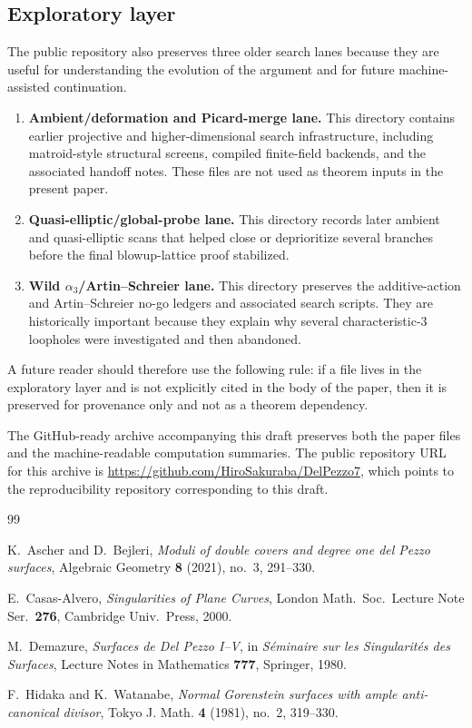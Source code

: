 \documentclass[11pt]{article}
\newcommand{\repourl}{\url{https://github.com/HiroSakuraba/DelPezzo7}}
\theoremstyle{definition}
\begin{document}
\subsection*{Exploratory layer}
The public repository also preserves three older search lanes because they are useful for understanding the evolution of the argument and for future machine-assisted continuation.
\begin{enumerate}[label=\textup{(E\arabic*)}]
\item \textbf{Ambient/deformation and Picard-merge lane.} This directory contains earlier projective and higher-dimensional search infrastructure, including matroid-style structural screens, compiled finite-field backends, and the associated handoff notes. These files are not used as theorem inputs in the present paper.
\item \textbf{Quasi-elliptic/global-probe lane.} This directory records later ambient and quasi-elliptic scans that helped close or deprioritize several branches before the final blowup-lattice proof stabilized.
\item \textbf{Wild $\alpha_3$/Artin--Schreier lane.} This directory preserves the additive-action and Artin--Schreier no-go ledgers and associated search scripts. They are historically important because they explain why several characteristic-$3$ loopholes were investigated and then abandoned.
\end{enumerate}

A future reader should therefore use the following rule: if a file lives in the exploratory layer and is not explicitly cited in the body of the paper, then it is preserved for provenance only and not as a theorem dependency.

The GitHub-ready archive accompanying this draft preserves both the paper files and the machine-readable computation summaries. The public repository URL for this archive is \repourl, which points to the reproducibility repository corresponding to this draft.

\begin{thebibliography}{99}

K.~Ascher and D.~Bejleri,
\emph{Moduli of double covers and degree one del Pezzo surfaces},
Algebraic Geometry \textbf{8} (2021), no.~3, 291--330.

E.~Casas-Alvero,
\emph{Singularities of Plane Curves},
London Math.\ Soc.\ Lecture Note Ser.~\textbf{276}, Cambridge Univ.~Press, 2000.

M.~Demazure,
\emph{Surfaces de Del Pezzo I--V},
in \emph{S\'eminaire sur les Singularit\'es des Surfaces},
Lecture Notes in Mathematics \textbf{777}, Springer, 1980.

F.~Hidaka and K.~Watanabe,
\emph{Normal Gorenstein surfaces with ample anti-canonical divisor},
Tokyo J. Math. \textbf{4} (1981), no.~2, 319--330.


\end{thebibliography}
\end{document}
